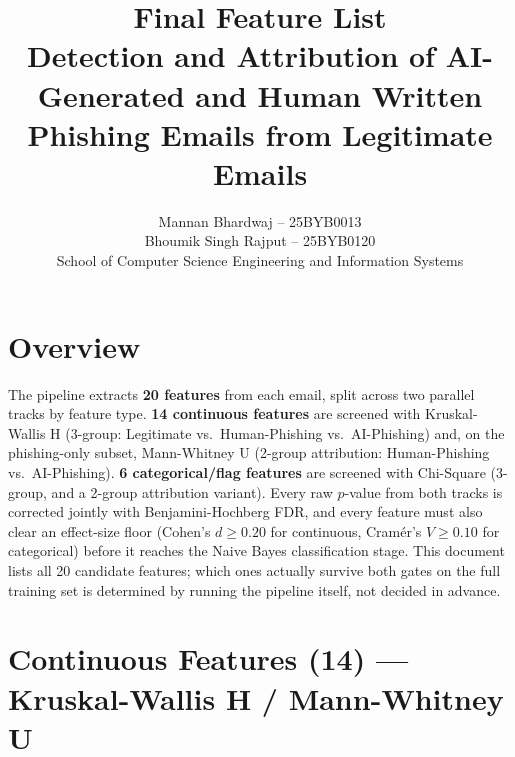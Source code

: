 \documentclass[11pt]{article}
\title{\textbf{Final Feature List}\\[2pt]\large Detection and Attribution of AI-Generated and Human Written
Phishing Emails from Legitimate Emails}
\author{Mannan Bhardwaj -- 25BYB0013 \\ Bhoumik Singh Rajput -- 25BYB0120 \\[4pt]
School of Computer Science Engineering and Information Systems}
\date{}
\begin{document}
\maketitle

\section*{Overview}
The pipeline extracts \textbf{20 features} from each email, split across two parallel tracks by
feature type. \textbf{14 continuous features} are screened with Kruskal-Wallis H (3-group:
Legitimate vs.\ Human-Phishing vs.\ AI-Phishing) and, on the phishing-only subset, Mann-Whitney U
(2-group attribution: Human-Phishing vs.\ AI-Phishing). \textbf{6 categorical/flag features} are
screened with Chi-Square (3-group, and a 2-group attribution variant). Every raw $p$-value from
both tracks is corrected jointly with Benjamini-Hochberg FDR, and every feature must also clear an
effect-size floor (Cohen's $d \geq 0.20$ for continuous, Cram\'er's $V \geq 0.10$ for categorical)
before it reaches the Naive Bayes classification stage. This document lists all 20 candidate
features; which ones actually survive both gates on the full training set is determined by running
the pipeline itself, not decided in advance.

\section{Continuous Features (14) --- Kruskal-Wallis H / Mann-Whitney U}
\end{document}
